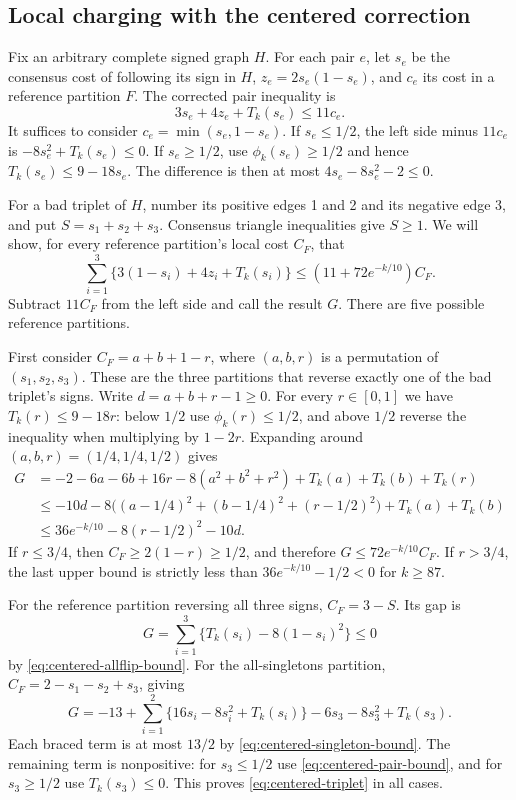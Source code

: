 \documentclass[11pt]{article}
\begin{document}
\subsection{Local charging with the centered correction}

Fix an arbitrary complete signed graph $H$. For each pair $e$, let
$s_e$ be the consensus cost of following its sign in $H$,
$z_e=2s_e(1-s_e)$, and $c_e$ its cost in a reference partition $F$.
The corrected pair inequality is
\begin{equation}
 3s_e+4z_e+T_k(s_e)\le11c_e.
 \label{eq:centered-pair}
\end{equation}
It suffices to consider $c_e=\min(s_e,1-s_e)$. If $s_e\le1/2$,
the left side minus $11c_e$ is
$-8s_e^2+T_k(s_e)\le0$. If $s_e\ge1/2$, use
$\phi_k(s_e)\ge1/2$ and hence $T_k(s_e)\le9-18s_e$.
The difference is then at most $4s_e-8s_e^2-2\le0$.

For a bad triplet of $H$, number its positive edges 1 and 2 and its
negative edge 3, and put $S=s_1+s_2+s_3$. Consensus triangle
inequalities give $S\ge1$. We will show, for every reference
partition's local cost $C_F$, that
\begin{equation}
 \sum_{i=1}^3\{3(1-s_i)+4z_i+T_k(s_i)\}
 \le(11+72e^{-k/10})C_F.
 \label{eq:centered-triplet}
\end{equation}
Subtract $11C_F$ from the left side and call the result $G$.
There are five possible reference partitions.

First consider $C_F=a+b+1-r$, where $(a,b,r)$ is a permutation of
$(s_1,s_2,s_3)$. These are the three partitions that reverse exactly
one of the bad triplet's signs. Write $d=a+b+r-1\ge0$.
For every $r\in[0,1]$ we have
$T_k(r)\le9-18r$: below $1/2$ use $\phi_k(r)\le1/2$, and above
$1/2$ reverse the inequality when multiplying by $1-2r$.
Expanding around $(a,b,r)=(1/4,1/4,1/2)$ gives
\begin{align*}
 G
 &=-2-6a-6b+16r-8(a^2+b^2+r^2)
                  +T_k(a)+T_k(b)+T_k(r)\\
 &\le -10d-8\bigl((a-1/4)^2+(b-1/4)^2+(r-1/2)^2\bigr)
                  +T_k(a)+T_k(b)\\
 &\le36e^{-k/10}-8(r-1/2)^2-10d.
\end{align*}
If $r\le3/4$, then $C_F\ge2(1-r)\ge1/2$, and therefore
$G\le72e^{-k/10}C_F$. If $r>3/4$, the last upper bound is
strictly less than $36e^{-k/10}-1/2<0$ for $k\ge87$.

For the reference partition reversing all three signs,
$C_F=3-S$. Its gap is
\[
 G=\sum_{i=1}^3\{T_k(s_i)-8(1-s_i)^2\}\le0
\]
by \eqref{eq:centered-allflip-bound}.
For the all-singletons partition, $C_F=2-s_1-s_2+s_3$, giving
\[
 G=-13+\sum_{i=1}^2\{16s_i-8s_i^2+T_k(s_i)\}
                  -6s_3-8s_3^2+T_k(s_3).
\]
Each braced term is at most $13/2$ by
\eqref{eq:centered-singleton-bound}. The remaining term is nonpositive:
for $s_3\le1/2$ use \eqref{eq:centered-pair-bound}, and for
$s_3\ge1/2$ use $T_k(s_3)\le0$. This proves
\eqref{eq:centered-triplet} in all cases.
\end{document}
